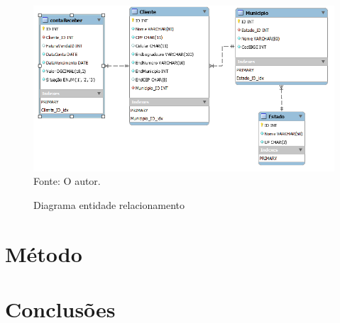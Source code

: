 \begin{figure}[!h]
  \caption{Diagrama entidade relacionamento}
  \includegraphics[width=\textwidth]{figure/diagram_EER.png}
  \label{fig:DER}
  {\fontsize{10pt}{\baselineskip}\selectfont
  Fonte: O autor.}
\end{figure}



\section{Método}





\section{Conclusões}



